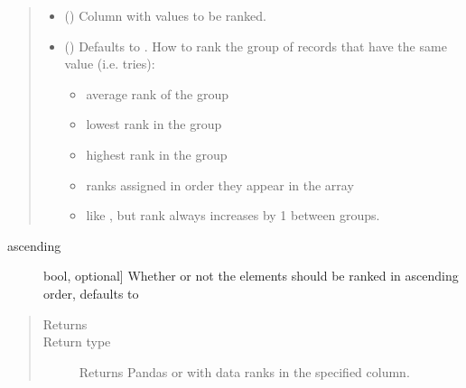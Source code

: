 \documentclass[letterpaper,10pt,english]{sphinxmanual}
\begin{document}
\begin{fulllineitems}
\begin{quote}
\begin{description}
\begin{itemize}
\item {} 
 () \textendash{} Column with values to be ranked.

\item {} 
 () \textendash{} 
Defaults to . How to rank the group of records that have the same value (i.e. tries):
\begin{itemize}
\item {} 
 average rank of the group

\item {} 
 lowest rank in the group

\item {} 
 highest rank in the group

\item {} 
 ranks assigned in order they appear in the array

\item {} 
 like , but rank always increases by 1 between groups.

\end{itemize}


\end{itemize}

\end{description}\end{quote}
\begin{description}
\item[{ascending}] \leavevmode{[}bool, optional{]}
Whether or not the elements should be ranked in ascending order, defaults to 

\end{description}
\begin{quote}\begin{description}
\item[{Returns}] \leavevmode
{}

\item[{Return type}] \leavevmode
Returns Pandas  or  with data ranks in the specified column.

\end{description}\end{quote}







\end{fulllineitems}
\end{document}
